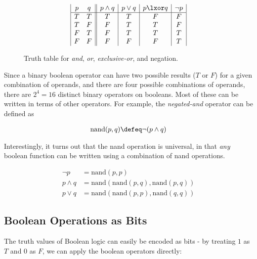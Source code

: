 \begin{figure}
  \centering

  \begin{displaymath}
\begin{array}{|c c||c|c|c|c|}
p & q & p \land q & p \lor q & p \lxor q & \neg p \\
\hline
T & T & T & T & F & F\\
T & F & F & T & T & F\\
F & T & F & T & T & T\\
F & F & F & F & F & T\\
\end{array}
\end{displaymath}
  \caption{Truth table for \emph{and}, \emph{or}, \emph{exclusive-or}, and negation.}
  \label{fig:truth-tables}
\end{figure}

Since a binary boolean operator can have two possible results ($T$ or
$F$) for a given combination of operands, and there are four possible
combinations of operands, there are $2^{4}=16$ distinct binary
operators on booleans.  Most of these can be written in terms of other
operators.  For example, the \emph{negated-and} operator can be defined as

\begin{align}
  \mathrm{nand}(p,q) \defeq \neg (p \land q)
\end{align}

Interestingly, it turns out that the nand operation is universal, in
that \emph{any} boolean function can be written using a combination of
nand operations.

\begin{example}
\begin{align}
  \neg p &= \mathrm{nand}(p,p) \\
  p \land q &= \mathrm{nand}(\mathrm{nand}(p,q),\mathrm{nand}(p,q)) \\
  p \lor q &= \mathrm{nand}(\mathrm{nand}(p,p),\mathrm{nand}(q,q))
\end{align}
\end{example}

\subsection{Boolean Operations as Bits}

The truth values of Boolean logic can easily be encoded as bits - by
treating $1$ as $T$ and $0$ as $F$, we can apply the boolean operators
directly:

